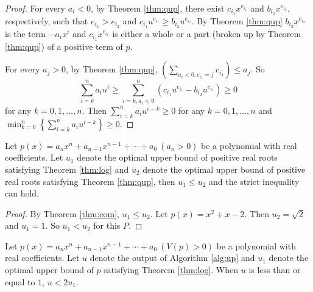 \begin{proof}
	
	For every $ a_i<0$, by Theorem \ref{thm:qup}, there exist  $c_{i_1}x^{e_{i_1}}$ and $b_{i_2}x^{e_{i_2}},$  respectively, such that
	$e_{i_1}>e_{i_2}$ and $c_{i_1}u^{e_{i_1}}\ge b_{i_2}u^{e_{i_2}}$. By  Theorem \ref{thm:qup} $b_{i_2}x^{e_{i_2} }$ is the term $-a_ix^i$
	and $c_{i_1}x^{e_{i_1} }$ is either a whole or a part (broken up by Theorem \ref{thm:qup}) of a positive term of $p$.
	
	For every  $a_j>0$, by Theorem \ref{thm:qup}, $\left( \sum_{a_i<0,e_{i_1}=j }c_{i_1} \right)\le a_{j}$. So \begin{dmath*}\sum_{i=k}^na_iu^i\ge \sum_{i=k,a_i<0}^n \left( c_{i_1}u^{e_{i_1}}-
		b_{i_2}u^{e_{i_2}} \right)\ge 0 \end{dmath*} for any $k= 0,1,\ldots,n$. Then $\sum_{i=k}^n a_i u^{i-k}\ge0 $ for any  $k= 0,1,\ldots,n$ and
	$\min_{k=0}^{n}\left\{  \sum_{i=k}^n a_i u^{i-k}\right\}\ge0$.
\end{proof}

\begin{theorem}\label{thm:com1}
	
	Let $p(x)=a_nx^n+a_{n-1}x^{n-1}+\cdots+a_0\ (a_n>0)$ be a polynomial with real coefficients. Let  $u_1$ denote the optimal upper bound of
	positive real roots satisfying Theorem \ref{thm:log} and $u_2$ denote the optimal upper bound of positive real roots satisfying Theorem \ref{thm:qup}, then $u_1\le u_2$ and the  strict inequality can hold.
\end{theorem}

\begin{proof}
	By Theorem \ref{thm:com}, $u_1\le u_2$.
	Let $p(x)=x^2+x-2$. Then $u_2=\sqrt{2}$ and $u_1=1$. So
	$u_1<u_2$ for this $P$.
\end{proof}



\begin{theorem}
	Let $p(x)=a_nx^n+a_{n-1}x^{n-1}+\cdots+a_0\ (V(p)> 0)$ be a polynomial with real coefficients. Let  $u$ denote the output of Algorithm \ref{alg:up} and $u_1$ denote the optimal upper bound of $p$ satisfying
	Theorem \ref{thm:log}. When $u$ is less than or equal to $1$, $u<2u_1$.
	
\end{theorem}



